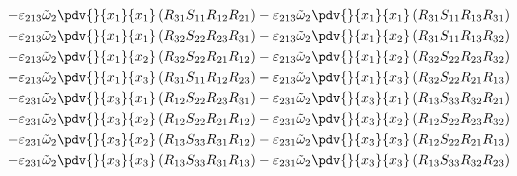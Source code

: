 \begin{equation}
	\begin{split}
		-\varepsilon_{213}\tilde{\omega}_{2}\pdv{}{x_{1}}{x_{1}}\left(R_{31}S_{11}R_{12}R_{21}\right)		-\varepsilon_{213}\tilde{\omega}_{2}\pdv{}{x_{1}}{x_{1}}\left(R_{31}S_{11}R_{13}R_{31}\right)\\
		-\varepsilon_{213}\tilde{\omega}_{2}\pdv{}{x_{1}}{x_{1}}\left(R_{32}S_{22}R_{23}R_{31}\right)		-\varepsilon_{213}\tilde{\omega}_{2}\pdv{}{x_{1}}{x_{2}}\left(R_{31}S_{11}R_{13}R_{32}\right)\\
		-\varepsilon_{213}\tilde{\omega}_{2}\pdv{}{x_{1}}{x_{2}}\left(R_{32}S_{22}R_{21}R_{12}\right)		-\varepsilon_{213}\tilde{\omega}_{2}\pdv{}{x_{1}}{x_{2}}\left(R_{32}S_{22}R_{23}R_{32}\right)\\
		-\varepsilon_{213}\tilde{\omega}_{2}\pdv{}{x_{1}}{x_{3}}\left(R_{31}S_{11}R_{12}R_{23}\right)		-\varepsilon_{213}\tilde{\omega}_{2}\pdv{}{x_{1}}{x_{3}}\left(R_{32}S_{22}R_{21}R_{13}\right)\\
		-\varepsilon_{231}\tilde{\omega}_{2}\pdv{}{x_{3}}{x_{1}}\left(R_{12}S_{22}R_{23}R_{31}\right)		-\varepsilon_{231}\tilde{\omega}_{2}\pdv{}{x_{3}}{x_{1}}\left(R_{13}S_{33}R_{32}R_{21}\right)\\
		-\varepsilon_{231}\tilde{\omega}_{2}\pdv{}{x_{3}}{x_{2}}\left(R_{12}S_{22}R_{21}R_{12}\right)		-\varepsilon_{231}\tilde{\omega}_{2}\pdv{}{x_{3}}{x_{2}}\left(R_{12}S_{22}R_{23}R_{32}\right)\\
		-\varepsilon_{231}\tilde{\omega}_{2}\pdv{}{x_{3}}{x_{2}}\left(R_{13}S_{33}R_{31}R_{12}\right)		-\varepsilon_{231}\tilde{\omega}_{2}\pdv{}{x_{3}}{x_{3}}\left(R_{12}S_{22}R_{21}R_{13}\right)\\
		-\varepsilon_{231}\tilde{\omega}_{2}\pdv{}{x_{3}}{x_{3}}\left(R_{13}S_{33}R_{31}R_{13}\right)		-\varepsilon_{231}\tilde{\omega}_{2}\pdv{}{x_{3}}{x_{3}}\left(R_{13}S_{33}R_{32}R_{23}\right)\\
	\end{split}
\end{equation}
